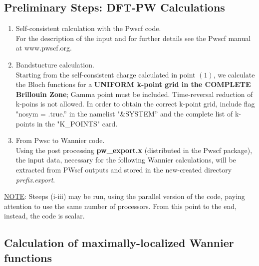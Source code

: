 \subsection{Preliminary Steps: DFT-PW
Calculations}\label{subsection:run_dft}
\renewcommand{\theenumi}{\roman{enumi}}
\renewcommand{\labelenumi}{\theenumi)}
\begin{enumerate}
\item Self-consistent calculation with the Pwscf code.\\
      \noindent For the description of the input and for further details see the Pwscf
      manual at www.pwscf.org.
\item Bandstucture calculation.\\
      \noindent  Starting from the self-consistent charge
      calculated in point $(1)$, we calculate the Bloch functions for a
      {\bf UNIFORM k-point grid in the COMPLETE Brillouin Zone}; Gamma point
      must be included. Time-reversal reduction of k-poins is not
      allowed. In order to obtain the correct k-point grid,
      include flag "nosym = .true.'' in the namelist "\&SYSTEM''
      and the complete list of k-points in the "K\_POINTS" card.
\item From Pwsc to Wannier code.\\
      \noindent Using the post processing
      {\bf pw\_export.x} (distributed in the Pwscf package),
      the input data, necessary for the following Wannier
      calculations,
      will be extracted from PWscf outputs and stored in the
      new-created directory {\em prefix.export}.
\end{enumerate}

\noindent \underline{NOTE}: Steeps (i-iii) may be run, using the
parallel version of the code, paying attention to use the same
number of processors. From this point to the end, instead, the
code is scalar.

\subsection {Calculation of maximally-localized Wannier
functions}\label{subsection:run_wannier}

